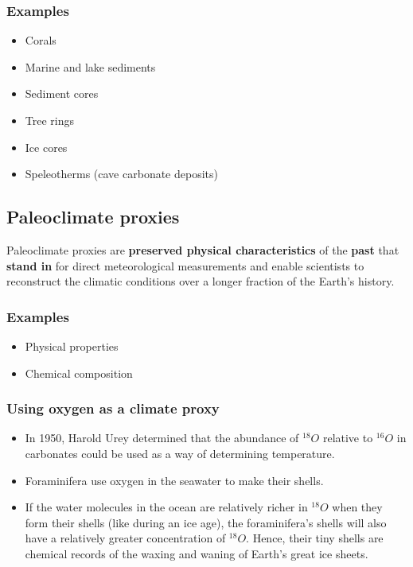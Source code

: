 \documentclass[11pt]{article}
\begin{document}
\subsubsection{Examples}
\label{sec:org4425e54}
\begin{itemize}
\item Corals
\item Marine and lake sediments
\item Sediment cores
\item Tree rings
\item Ice cores
\item Speleotherms (cave carbonate deposits)
\end{itemize}

\subsection{Paleoclimate proxies}
\label{sec:org43d88b3}
Paleoclimate proxies are \textbf{preserved physical characteristics} of the \textbf{past} that \textbf{stand in} for direct meteorological measurements and enable scientists to reconstruct the climatic conditions over a longer fraction of the Earth's history.

\subsubsection{Examples}
\label{sec:org4d46580}
\begin{itemize}
\item Physical properties
\item Chemical composition
\end{itemize}

\subsubsection{Using oxygen as a climate proxy}
\label{sec:org2a9e822}
\begin{itemize}
\item In 1950, Harold Urey determined that the abundance of \(^{18}O\) relative to \(^{16}O\) in carbonates could be used as a way of determining temperature.
\item Foraminifera use oxygen in the seawater to make their shells.
\item If the water molecules in the ocean are relatively richer in \(^{18}O\) when they form their shells (like during an ice age), the foraminifera's shells will also have a relatively greater concentration of \(^{18}O\). Hence, their tiny shells are chemical records of the waxing and waning of Earth's great ice sheets.
\end{itemize}
\end{document}
